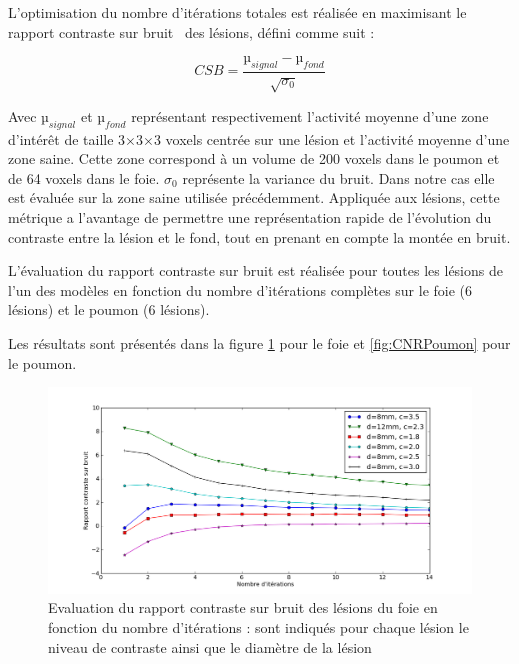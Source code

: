 L'optimisation du nombre d'itérations totales est réalisée en maximisant le rapport contraste sur bruit~\cite{takahara2004diffusion} des lésions, défini comme suit :

\begin{equation}
 CSB = \frac{µ_{signal} - µ_{fond}}{\sqrt{\sigma_0}}
\end{equation}

Avec $µ_{signal}$ et $µ_{fond}$ représentant respectivement l'activité moyenne d'une zone d'intérêt de taille 3$\times$3$\times$3 voxels centrée sur une lésion et l'activité moyenne d'une zone saine. Cette zone correspond à un volume de 200 voxels dans le poumon et de 64 voxels dans le foie. $\sigma_0$ représente la variance du bruit. Dans notre cas elle est évaluée sur la zone saine utilisée précédemment. Appliquée aux lésions, cette métrique a l'avantage de permettre une représentation rapide de l'évolution du contraste entre la lésion et le fond, tout en prenant en compte la montée en bruit.

L'évaluation du rapport contraste sur bruit est réalisée pour toutes les lésions de l'un des modèles en fonction du nombre d'itérations complètes sur le foie (6 lésions) et le poumon (6 lésions).

Les résultats sont présentés dans la figure \ref{fig:CNRFoie} pour le foie et \ref{fig:CNRPoumon} pour le poumon.

\begin{figure}
\centering
\includegraphics[width=17cm]{images/CNRFoie}
\caption[Evaluation du rapport contraste sur bruit des lésions du foie en fonction du nombre d'itérations]{Evaluation du rapport contraste sur bruit des lésions du foie en fonction du nombre d'itérations : sont indiqués pour chaque lésion le niveau de contraste ainsi que le diamètre de la lésion}
\label{fig:CNRFoie}
\end{figure}


